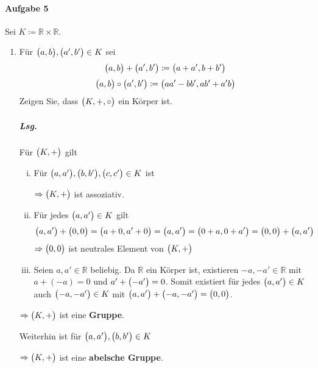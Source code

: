 \documentclass{scrreprt}
\begin{document}
\paragraph{Aufgabe 5} Sei $K \coloneqq \mathbb{R} \times \mathbb{R}$.
\begin{enumerate}[(1)]
\item \label{sec:5_1}
  Für $\qty\big(a, b), \qty\big(a', b') \in K$ sei
  \[
    \qty\big(a, b) + \qty\big(a', b') \coloneqq \qty\big(a + a', b + b')
  \]
  \[
    \qty\big(a, b) \circ \qty\big(a', b') \coloneqq
    \qty\big(aa' - bb', ab' + a'b)
  \]
  Zeigen Sie, dass $\qty\big(K, +, \circ)$ ein Körper ist.

  \subparagraph{Lsg.} Für $\qty\big(K, +)$ gilt
  \begin{enumerate}[(i)]
  \item Für $\qty\big(a, a'), \qty\big(b, b'), \qty\big(c, c') \in K$ ist
    $\Rightarrow \qty\big(K, +)$ ist assoziativ.

  \item Für jedes $\qty\big(a, a') \in K$ gilt
    \[
      \qty\big(a, a') + \qty\big(0, 0)
      = \qty\big(a + 0, a' + 0) = \qty\big(a, a')
      = \qty\big(0 + a, 0 + a')
      = \qty\big(0, 0) + \qty\big(a, a')
    \]
    $\Rightarrow \qty\big(0, 0)$ ist neutrales Element von $\qty\big(K, +)$

  \item Seien $a, a' \in \mathbb{R}$ beliebig.
    Da $\mathbb{R}$ ein Körper ist, existieren $-a, -a' \in \mathbb{R}$
    mit $a + (-a) = 0$ und $a' + \qty\big(-a') = 0$.
    Somit existiert für jedes $\qty\big(a, a') \in K$ auch
    $\qty\big(-a, -a') \in K$ mit
    $\qty\big(a, a') + \qty\big(-a, -a') = \qty\big(0, 0)$.
  \end{enumerate}

  $\Rightarrow \qty\big(K, +)$ ist eine \textbf{Gruppe}.

  Weiterhin ist für $\qty\big(a, a'), \qty\big(b, b') \in K$
  $\Rightarrow \qty\big(K, +)$ ist eine \textbf{abelsche Gruppe}.


\end{enumerate}
\end{document}
